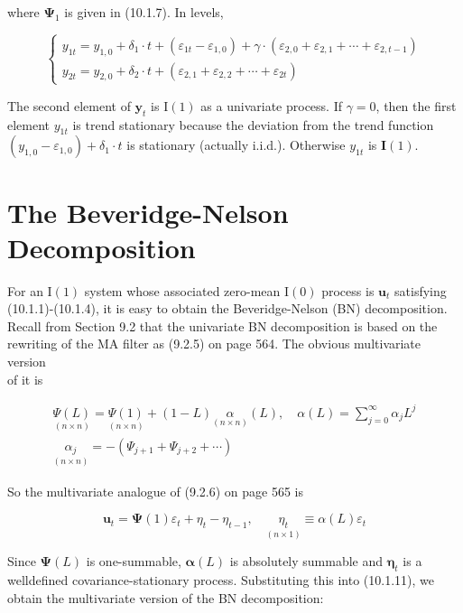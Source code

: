\documentclass[10pt]{article}
\begin{document}
where $\boldsymbol{\Psi}_{1}$ is given in (10.1.7). In levels,

\[
\left\{\begin{array}{l}
y_{1 t}=y_{1,0}+\delta_{1} \cdot t+\left(\varepsilon_{1 t}-\varepsilon_{1,0}\right)+\gamma \cdot\left(\varepsilon_{2,0}+\varepsilon_{2,1}+\cdots+\varepsilon_{2, t-1}\right)  \tag{10.1.13}\\
y_{2 t}=y_{2,0}+\delta_{2} \cdot t+\left(\varepsilon_{2,1}+\varepsilon_{2,2}+\cdots+\varepsilon_{2 t}\right)
\end{array}\right.
\]

The second element of $\mathbf{y}_{t}$ is $\mathrm{I}(1)$ as a univariate process. If $\gamma=0$, then the first element $y_{1 t}$ is trend stationary because the deviation from the trend function $\left(y_{1,0}-\varepsilon_{1,0}\right)+\delta_{1} \cdot t$ is stationary (actually i.i.d.). Otherwise $y_{1 t}$ is $\mathbf{I}(1)$.

\section*{The Beveridge-Nelson Decomposition}
For an $\mathrm{I}(1)$ system whose associated zero-mean $\mathrm{I}(0)$ process is $\mathbf{u}_{t}$ satisfying (10.1.1)-(10.1.4), it is easy to obtain the Beveridge-Nelson (BN) decomposition. Recall from Section 9.2 that the univariate BN decomposition is based on the rewriting of the MA filter as (9.2.5) on page 564. The obvious multivariate version\\
of it is


\begin{gather*}
\underset{(n \times n)}{\Psi(L)}=\underset{(n \times n)}{\Psi(1)}+(1-L) \underset{(n \times n)}{\alpha}(L), \quad \alpha(L)=\sum_{j=0}^{\infty} \alpha_{j} L^{j} \\
\underset{(n \times n)}{\alpha_{j}}=-\left(\Psi_{j+1}+\Psi_{j+2}+\cdots\right) \tag{10.1.14}
\end{gather*}


So the multivariate analogue of (9.2.6) on page 565 is


\begin{equation*}
\mathbf{u}_{t}=\boldsymbol{\Psi}(1) \varepsilon_{t}+\eta_{t}-\eta_{t-1}, \quad \underset{(n \times 1)}{\eta_{t}} \equiv \alpha(L) \varepsilon_{t} \tag{10.1.15}
\end{equation*}


Since $\boldsymbol{\Psi}(L)$ is one-summable, $\boldsymbol{\alpha}(L)$ is absolutely summable and $\boldsymbol{\eta}_{t}$ is a welldefined covariance-stationary process. Substituting this into (10.1.11), we obtain the multivariate version of the BN decomposition:
\end{document}

